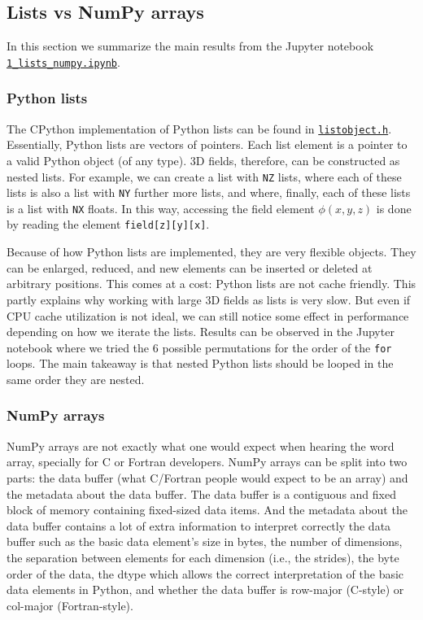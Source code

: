 \documentclass[12pt]{article}
\begin{document}
\subsection{Lists vs NumPy arrays}

In this section we summarize the main results from the Jupyter notebook \href{run:./1_lists_numpy.ipynb}{\texttt{1\_lists\_numpy.ipynb}}.

\subsubsection{Python lists}

The CPython implementation of Python lists can be found in \href{https://github.com/python/cpython/blob/main/Include/cpython/listobject.h}{\texttt{listobject.h}}. Essentially, Python lists are vectors of pointers. Each list element is a pointer to a valid Python object (of any type). 3D fields, therefore, can be constructed as nested lists. For example, we can create a list with \texttt{NZ} lists, where each of these lists is also a list with \texttt{NY} further more lists, and where, finally, each of these lists is a list with \texttt{NX} floats. In this way, accessing the field element $\phi(x,y,z)$ is done by reading the element \texttt{field[z][y][x]}.

Because of how Python lists are implemented, they are very flexible objects. They can be enlarged, reduced, and new elements can be inserted or deleted at arbitrary positions. This comes at a cost: Python lists are not cache friendly. This partly explains why working with large 3D fields as lists is very slow. But even if CPU cache utilization is not ideal, we can still notice some effect in performance depending on how we iterate the lists. Results can be observed in the Jupyter notebook where we tried the 6 possible permutations for the order of the \texttt{for} loops. The main takeaway is that nested Python lists should be looped in the same order they are nested.

\subsubsection{NumPy arrays}

NumPy arrays are not exactly what one would expect when hearing the word array, specially for C or Fortran developers. NumPy arrays can be split into two parts: the data buffer (what C/Fortran people would expect to be an array) and the metadata about the data buffer. The data buffer is a contiguous and fixed block of memory containing fixed-sized data items. And the metadata about the data buffer contains a lot of extra information to interpret correctly the data buffer such as the basic data element's size in bytes, the number of dimensions, the separation between elements for each dimension (i.e., the strides), the byte order of the data, the dtype which allows the correct interpretation of the basic data elements in Python, and whether the data buffer is row-major (C-style) or col-major (Fortran-style).
\end{document}
